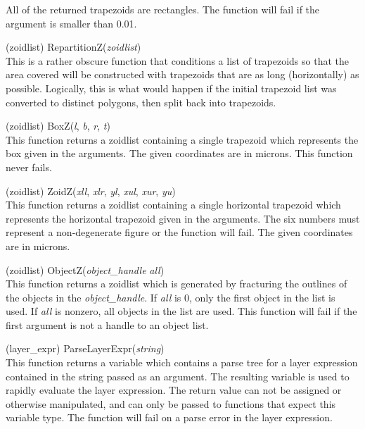 \begin{description}
All of the returned trapezoids are rectangles.  The function will fail
if the argument is smaller than 0.01.

\item{(zoidlist) \vt RepartitionZ({\it zoidlist\/})}\\
This is a rather obscure function that conditions a list of trapezoids
so that the area covered will be constructed with trapezoids that are
as long (horizontally) as possible.  Logically, this is what would
happen if the initial trapezoid list was converted to distinct
polygons, then split back into trapezoids.

\item{(zoidlist) \vt BoxZ({\it l}, {\it b}, {\it r}, {\it t\/})}\\
This function returns a zoidlist containing a single trapezoid which
represents the box given in the arguments.  The given coordinates are
in microns.  This function never fails.

\item{(zoidlist) \vt ZoidZ({\it xll}, {\it xlr}, {\it yl},
 {\it xul}, {\it xur}, {\it yu\/})}\\
This function returns a zoidlist containing a single horizontal
trapezoid which represents the horizontal trapezoid given in the
arguments.  The six numbers must represent a non-degenerate figure or
the function will fail.  The given coordinates are in microns.

\item{(zoidlist) \vt ObjectZ({\it object\_handle} {\it all\/})}\\
This function returns a zoidlist which is generated by fracturing the
outlines of the objects in the {\it object\_handle}.  If {\it all} is
0, only the first object in the list is used.  If {\it all} is
nonzero, all objects in the list are used.  This function will fail if
the first argument is not a handle to an object list.

\item{(layer\_expr) \vt ParseLayerExpr({\it string\/})}\\
This function returns a variable which contains a parse tree for a
layer expression contained in the string passed as an argument.  The
resulting variable is used to rapidly evaluate the layer expression. 
The return value can not be assigned or otherwise manipulated, and can
only be passed to functions that expect this variable type.  The
function will fail on a parse error in the layer expression.


\end{description}
